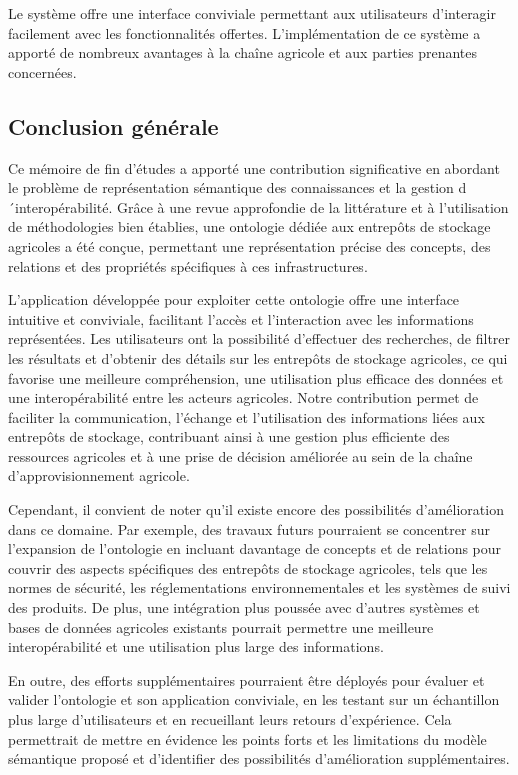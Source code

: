 \documentclass{article}
\begin{document}
		Le système offre une interface conviviale permettant aux utilisateurs d'interagir
	facilement avec les fonctionnalités offertes. L'implémentation de ce système a apporté de
	nombreux avantages à la chaîne agricole et aux parties prenantes concernées.
	
	\subsection{Conclusion générale}
	Ce mémoire de fin d'études a apporté une contribution significative en abordant le
	problème de représentation sémantique des connaissances et la gestion d´interopérabilité. Grâce
	à une revue approfondie de la littérature et à l'utilisation de méthodologies bien établies, une
	ontologie dédiée aux entrepôts de stockage agricoles a été conçue, permettant une représentation
	précise des concepts, des relations et des propriétés spécifiques à ces infrastructures.
		
		L'application développée pour exploiter cette ontologie offre une interface intuitive et
	conviviale, facilitant l'accès et l'interaction avec les informations représentées. Les utilisateurs
	ont la possibilité d'effectuer des recherches, de filtrer les résultats et d'obtenir des détails sur les
	entrepôts de stockage agricoles, ce qui favorise une meilleure compréhension, une utilisation
	plus efficace des données et une interopérabilité entre les acteurs agricoles.
	Notre contribution permet de faciliter la communication, l'échange et l'utilisation des
	informations liées aux entrepôts de stockage, contribuant ainsi à une gestion plus efficiente des
	ressources agricoles et à une prise de décision améliorée au sein de la chaîne
	d'approvisionnement agricole.
		
		Cependant, il convient de noter qu'il existe encore des possibilités d'amélioration dans
	ce domaine. Par exemple, des travaux futurs pourraient se concentrer sur l'expansion de
	l'ontologie en incluant davantage de concepts et de relations pour couvrir des aspects
	spécifiques des entrepôts de stockage agricoles, tels que les normes de sécurité, les
	réglementations environnementales et les systèmes de suivi des produits. De plus, une
	intégration plus poussée avec d'autres systèmes et bases de données agricoles existants pourrait
	permettre une meilleure interopérabilité et une utilisation plus large des informations.
		
		En outre, des efforts supplémentaires pourraient être déployés pour évaluer et valider
	l'ontologie et son application conviviale, en les testant sur un échantillon plus large d'utilisateurs
	et en recueillant leurs retours d'expérience. Cela permettrait de mettre en évidence les points
	forts et les limitations du modèle sémantique proposé et d'identifier des possibilités
	d'amélioration supplémentaires.
	
\end{document}
